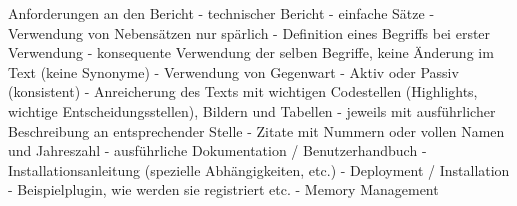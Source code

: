 \documentclass[
	11pt,
	a4paper,
	bibtotocnumbered
	]{scrreprt}
\begin{document}
\begin{singlespace}

\setcounter{page}{1}
\end{singlespace}

\tableofcontents

\cleardoublepage





Anforderungen an den Bericht
- technischer Bericht
- einfache Sätze
- Verwendung von Nebensätzen nur spärlich
- Definition eines Begriffs bei erster Verwendung
- konsequente Verwendung der selben Begriffe, keine Änderung im Text (keine Synonyme)
- Verwendung von Gegenwart
- Aktiv oder Passiv (konsistent)
- Anreicherung des Texts mit wichtigen Codestellen (Highlights, wichtige Entscheidungsstellen), Bildern und Tabellen
- jeweils mit ausführlicher Beschreibung an entsprechender Stelle
- Zitate mit Nummern oder vollen Namen und Jahreszahl
- ausführliche Dokumentation / Benutzerhandbuch 
- Installationsanleitung (spezielle Abhängigkeiten, etc.)
- Deployment / Installation
- Beispielplugin, wie werden sie registriert etc.
- Memory Management









\begin{singlespace}
\printbibliography
\end{singlespace}

\end{document}
